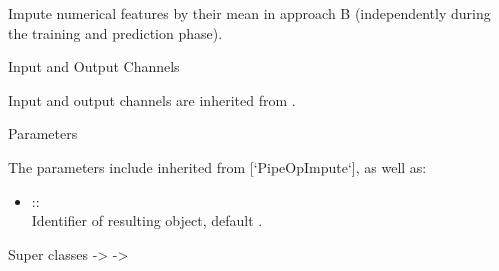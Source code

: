 \documentclass[letterpaper]{book}
\begin{document}
%
\begin{Description}\relax
Impute numerical features by their mean in approach B (independently during the training and prediction phase).
\end{Description}
%
\begin{Section}{Input and Output Channels}

Input and output channels are inherited from .
\end{Section}
%
\begin{Section}{Parameters}

The parameters include inherited from [`PipeOpImpute`], as well as: \\{}
\begin{itemize}

\item{}  :: \\{}
Identifier of resulting object, default .

\end{itemize}

\end{Section}
%
\begin{Section}{Super classes}
 ->  -> 
\end{Section}
%
\end{document}
